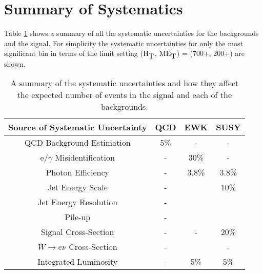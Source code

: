 \section{Summary of Systematics}

Table \ref{tab:Systematics_Summary} shows a summary of all the systematic
uncertainties for the backgrounds and the signal. For simplicity the systematic
uncertainties for only the most significant bin in terms of the limit setting 
($\mbox{H}_{\mbox{T}}$, $\mbox{ME}_{\mbox{T}}$) = (700+, 200+) are shown.

\begin{table}
\begin{center}
\begin{tabular}{|c|c|c|c|}
\hline
{\bf Source of Systematic Uncertainty} & {\bf QCD} & {\bf EWK} & {\bf SUSY} \\
\hline
QCD Background Estimation & 5\% & - & - \\
\hline
e/$\gamma$ Misidentification & - & 30\% & - \\
\hline
Photon Efficiency & - & 3.8\% & 3.8\% \\
\hline
Jet Energy Scale & - & & 10\% \\
\hline
Jet Energy Resolution & - & & \\
\hline
Pile-up & - & & \\
\hline
Signal Cross-Section & - & - & 20\% \\
\hline
$W\rightarrow e\nu$ Cross-Section & - &  & - \\
\hline
Integrated Luminosity & - & 5\% & 5\% \\
\hline
\end{tabular}
\end{center}
\caption{A summary of the systematic uncertainties and how they affect the
expected number of events in the signal and each of the backgrounds.}
\label{tab:Systematics_Summary}
\end{table}
